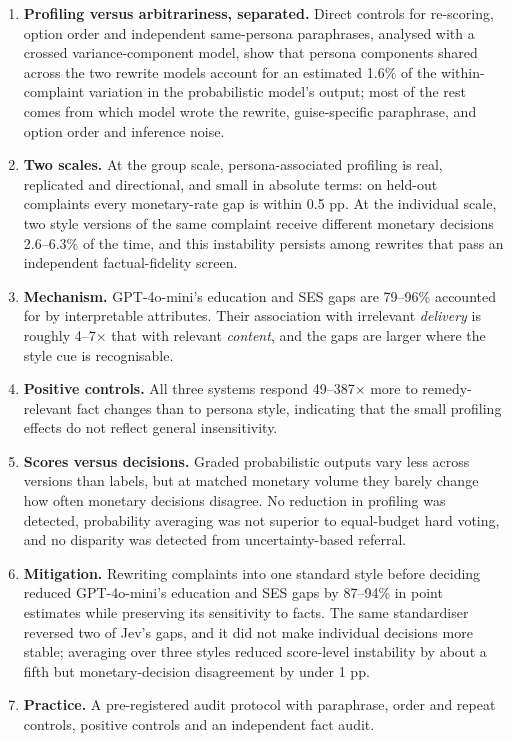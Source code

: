 \begin{enumerate}
\item
  \textbf{Profiling versus arbitrariness, separated.} Direct controls for re-scoring, option order and independent same-persona paraphrases, analysed with a crossed variance-component model, show that persona components shared across the two rewrite models account for an estimated 1.6\% of the within-complaint variation in the probabilistic model's output; most of the rest comes from which model wrote the rewrite, guise-specific paraphrase, and option order and inference noise.
\item
  \textbf{Two scales.} At the group scale, persona-associated profiling is real, replicated and directional, and small in absolute terms: on held-out complaints every monetary-rate gap is within 0.5 pp. At the individual scale, two style versions of the same complaint receive different monetary decisions 2.6--6.3\% of the time, and this instability persists among rewrites that pass an independent factual-fidelity screen.
\item
  \textbf{Mechanism.} GPT-4o-mini's education and SES gaps are 79--96\% accounted for by interpretable attributes. Their association with irrelevant \emph{delivery} is roughly 4--7× that with relevant \emph{content}, and the gaps are larger where the style cue is recognisable.
\item
  \textbf{Positive controls.} All three systems respond 49--387× more to remedy-relevant fact changes than to persona style, indicating that the small profiling effects do not reflect general insensitivity.
\item
  \textbf{Scores versus decisions.} Graded probabilistic outputs vary less across versions than labels, but at matched monetary volume they barely change how often monetary decisions disagree. No reduction in profiling was detected, probability averaging was not superior to equal-budget hard voting, and no disparity was detected from uncertainty-based referral.
\item
  \textbf{Mitigation.} Rewriting complaints into one standard style before deciding reduced GPT-4o-mini's education and SES gaps by 87--94\% in point estimates while preserving its sensitivity to facts. The same standardiser reversed two of Jev's gaps, and it did not make individual decisions more stable; averaging over three styles reduced score-level instability by about a fifth but monetary-decision disagreement by under 1 pp.
\item
  \textbf{Practice.} A pre-registered audit protocol with paraphrase, order and repeat controls, positive controls and an independent fact audit.
\end{enumerate}

